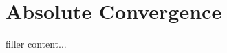 \documentclass[../../templates/section]{subfiles}
\begin{document}
\section{Absolute Convergence}\label{sec:absolute-convergence}

filler content...
\end{document}
